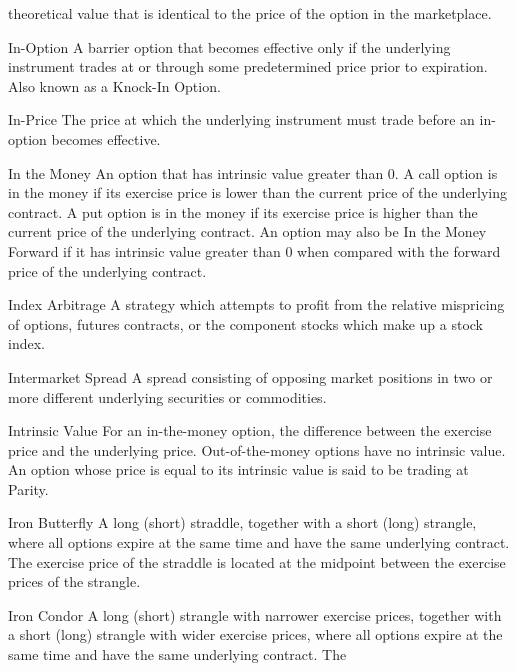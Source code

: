 theoretical value that is identical to the price of the option in the marketplace.\par
In-Option A barrier option that becomes effective only if the underlying instrument trades at or through some predetermined price prior to expiration. Also known as a Knock-In Option.\par
In-Price The price at which the underlying instrument must trade before an in-option becomes effective.\par
In the Money An option that has intrinsic value greater than 0. A call option is in the money if its exercise price is lower than the current price of the underlying contract. A put option is in the money if its exercise price is higher than the current price of the underlying contract. An option may also be In the Money Forward if it has intrinsic value greater than 0 when compared with the forward price of the underlying contract.\par
Index Arbitrage A strategy which attempts to profit from the relative mispricing of options, futures contracts, or the component stocks which make up a stock index.\par
Intermarket Spread A spread consisting of opposing market positions in two or more different underlying securities or commodities.\par
Intrinsic Value For an in-the-money option, the difference between the exercise price and the underlying price. Out-of-the-money options have no intrinsic value. An option whose price is equal to its intrinsic value is said to be trading at Parity.\par
Iron Butterfly A long (short) straddle, together with a short (long) strangle, where all options expire at the same time and have the same underlying contract. The exercise price of the straddle is located at the midpoint between the exercise prices of the strangle.\par
Iron Condor A long (short) strangle with narrower exercise prices, together with a short (long) strangle with wider exercise prices, where all options expire at the same time and have the same underlying contract. The\par

